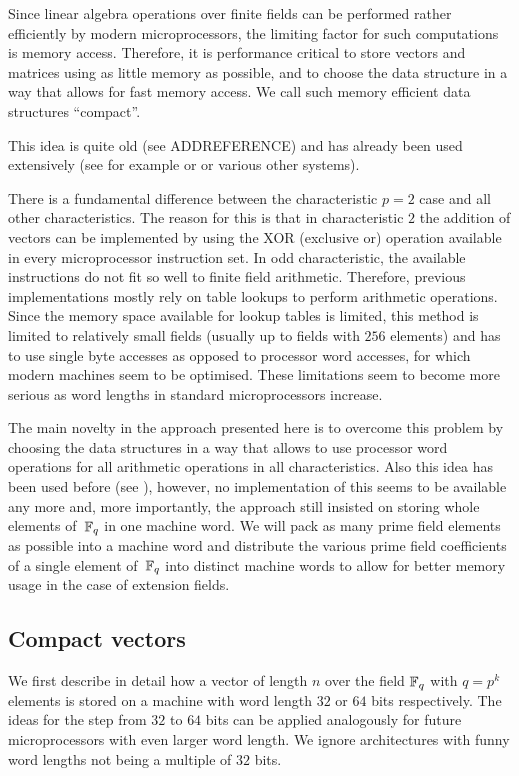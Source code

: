 Since linear algebra operations over finite fields can be performed
rather efficiently by modern microprocessors, the limiting factor 
for such computations is memory access. Therefore, it is performance
critical to store vectors and matrices using as little memory as possible,
and to choose the data structure in a way that allows for fast memory
access. We call such memory efficient data structures ``compact''.

This idea is quite old (see ADDREFERENCE) and has already been used
extensively (see for example \cite{CMeatAxe} or \cite{GAP4} or
various other systems).

There is a fundamental difference between the characteristic $p=2$ case
and all other characteristics. The reason for this is that in
characteristic $2$ the addition of vectors can be implemented by using
the XOR (exclusive or) operation available in every microprocessor
instruction set. In odd characteristic, the available instructions
do not fit so well to finite field arithmetic. Therefore, previous
implementations mostly rely on table lookups to perform arithmetic
operations. Since the memory space available for lookup tables is
limited, this method is limited to relatively small fields (usually up to
fields with $256$ elements) and has to use single byte accesses
as opposed to processor word accesses, for which modern machines
seem to be optimised. These limitations seem to become more serious
as word lengths in standard microprocessors increase.

The main novelty in the approach presented here is to overcome this
problem by choosing the data structures in a way that allows to use
processor word operations for all arithmetic operations in all
characteristics. Also this idea has been used before (see
\cite{EssenLinAlg}), however, no implementation of this seems to
be available any more and, more importantly, the approach still
insisted on storing whole elements of\, $\mathbb{F}_q$ in one machine word.
We will pack as many prime field elements as possible into a machine
word and distribute the various prime field coefficients of a single
element of\, $\mathbb{F}_q$ into distinct machine words to allow for better
memory usage in the case of extension fields.


\subsection{Compact vectors}
\label{ssec:cvec}

We first describe in detail how a vector of length $n$ over the field
$\mathbb{F}_q$ with $q=p^k$ elements is stored on a machine with word length $32$ 
or $64$ bits respectively. The ideas for the step from $32$ to $64$ bits
can be applied analogously for future microprocessors with even larger
word length. We ignore architectures with funny word lengths not being
a multiple of $32$ bits.

